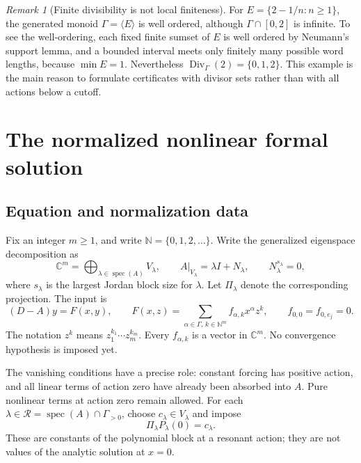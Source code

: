 \documentclass[11pt,a4paper]{article}
\numberwithin{equation}{section}
\theoremstyle{definition}
\theoremstyle{remark}
\newtheorem{remark}[theorem]{Remark}
\newcommand{\CC}{\mathbb C}
\newcommand{\NN}{\mathbb N}
\newcommand{\G}{\Gamma}
\newcommand{\Reson}{\mathcal R}
\newcommand{\Div}{\operatorname{Div}}
\newcommand{\spec}{\operatorname{spec}}
\begin{document}
\begin{remark}[Finite divisibility is not local finiteness]\label{rem:not-local}
For \(E=\{2-1/n:n\ge1\}\), the generated monoid
\(\G=\langle E\rangle\) is well ordered, although
\(\G\cap[0,2]\) is infinite. To see the well-ordering, each fixed
finite sumset of \(E\) is well ordered by Neumann's support lemma, and
a bounded interval meets only finitely many possible word lengths,
because \(\min E=1\). Nevertheless
\(\Div_\G(2)=\{0,1,2\}\).
This example is the main reason to formulate certificates with divisor
sets rather than with all actions below a cutoff.
\end{remark}

\section{The normalized nonlinear formal solution}
\label{sec:formal}

\subsection{Equation and normalization data}
Fix an integer \(m\ge1\), and write \(\NN=\{0,1,2,\ldots\}\).
Write the generalized eigenspace decomposition as
\[
 \CC^m=\bigoplus_{\lambda\in\spec(A)}V_\lambda,
 \qquad A|_{V_\lambda}=\lambda I+N_\lambda,
 \qquad N_\lambda^{s_\lambda}=0,
\]
where \(s_\lambda\) is the largest Jordan block size for \(\lambda\).
Let \(\Pi_\lambda\) denote the corresponding projection. The input is
\begin{equation}\label{eq:model}
 (D-A)y=F(x,y),\qquad
 F(x,z)=\sum_{\alpha\in\G,\,k\in\NN^m}
            f_{\alpha,k}x^\alpha z^k,
 \qquad f_{0,0}=f_{0,e_j}=0.
\end{equation}
The notation \(z^k\) means \(z_1^{k_1}\cdots z_m^{k_m}\).
Every \(f_{\alpha,k}\) is a vector in \(\CC^m\).
No convergence hypothesis is imposed yet.

The vanishing conditions have a precise role: constant forcing has
positive action, and all linear terms of action zero have already been
absorbed into \(A\). Pure nonlinear terms at action zero remain allowed.
For each \(\lambda\in\Reson=\spec(A)\cap\G_{>0}\), choose
\(c_\lambda\in V_\lambda\) and impose
\begin{equation}\label{eq:normalization}
 \Pi_\lambda P_\lambda(0)=c_\lambda.
\end{equation}
These are constants of the polynomial block at a resonant action; they
are not values of the analytic solution at \(x=0\).
\end{document}
